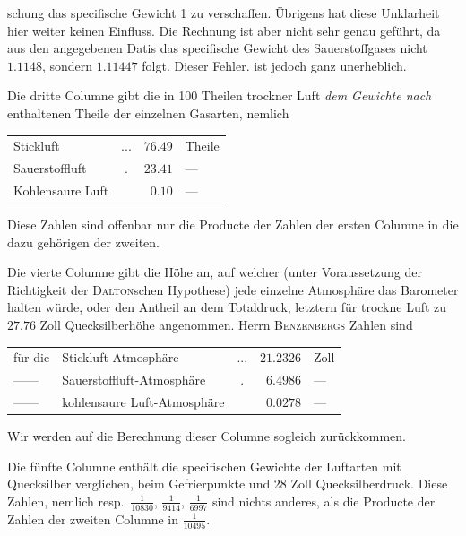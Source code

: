 schung das specifische Gewicht 1 zu verschaffen. Übrigens hat diese Unklarheit hier weiter keinen Einfluss. Die Rechnung ist aber nicht sehr genau geführt, da aus den angegebenen Datis das specifische Gewicht des Sauerstoffgases nicht $1.1148$, sondern $1.11447$ folgt. Dieser Fehler. ist jedoch ganz unerheblich.

Die dritte Columne gibt die in 100 Theilen trockner Luft \textit{dem Gewichte nach} enthaltenen Theile der einzelnen Gasarten, nemlich
\begin{center}\begin{tabular}{lcrl}
Stickluft & .\quad .\quad . & $76.49$ & Theile\\
Sauerstoffluft & . & $23.41$ & —\\
Kohlensaure Luft & & $0.10$ & —
\end{tabular}\end{center}
Diese Zahlen sind offenbar nur die Producte der Zahlen der ersten Columne in die dazu gehörigen der zweiten.

Die vierte Columne gibt die Höhe an, auf welcher (unter Voraussetzung der Richtigkeit der \textsc{Dalton}schen Hypothese) jede einzelne Atmosphäre das Barometer halten würde, oder den Antheil an dem Totaldruck, letztern für trockne Luft zu $27.76$ Zoll Quecksilberhöhe angenommen. Herrn \textsc{Benzenbergs} Zahlen sind
\begin{center}\begin{tabular}{llcrl}
für die & Stickluft-Atmosphäre & .\quad .\quad . & $21.2326$ & Zoll\\
—\quad — & Sauerstoffluft-Atmosphäre & . & $6.4986$ & —\\
—\quad — & kohlensaure Luft-Atmosphäre & & $0.0278$ & —
\end{tabular}\end{center}
Wir werden auf die Berechnung dieser Columne sogleich zurückkommen.

Die fünfte Columne enthält die specifischen Gewichte der Luftarten mit Quecksilber verglichen, beim Gefrierpunkte und 28 Zoll Quecksilberdruck. Diese Zahlen, nemlich resp.\ $\frac{1}{10830}$, $\frac{1}{9414}$, $\frac{1}{6997}$ sind nichts anderes, als die Producte der Zahlen der zweiten Columne in $\frac{1}{10495}$.

